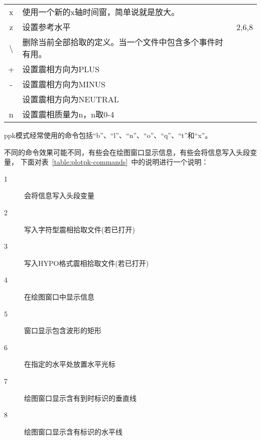 \begin{table}[H]
\begin{tabular}{cll}
    x	    &	使用一个新的x轴时间窗，简单说就是放大。 &           \\
    z	    &	设置参考水平                            &   2,6,8	\\
    \textbackslash	    &	删除当前全部拾取的定义。当一个文件中包含多个事件时有用。&	\\
    +	    &	设置震相方向为PLUS	                    &           \\
    -	    &	设置震相方向为MINUS	                    &           \\
    \lstinline[showspaces]! !   &	设置震相方向为NEUTRAL	                &           \\
    n	    &	设置震相质量为n，n取0-4	                &           \\
	\bottomrule
\end{tabular}
\end{table}

ppk模式经常使用的命令包括``b''、``l''、``n''、``o''、``q''、``t''和``x''。

不同的命令效果可能不同，有些会在绘图窗口显示信息，有些会将信息写入头段变量，
下面对表~\ref{table:plotpk-commands}~中的说明进行一个说明：
\begin{description}
    \item [1] 会将信息写入头段变量
    \item [2] 写入字符型震相拾取文件(若已打开)
    \item [3] 写入HYPO格式震相拾取文件(若已打开)
    \item [4] 在绘图窗口中显示信息
    \item [5] 窗口显示包含波形的矩形
    \item [6] 在指定的水平处放置水平光标
    \item [7] 绘图窗口显示含有到时标识的垂直线
    \item [8] 绘图窗口显示含有标识的水平线
\end{description}
